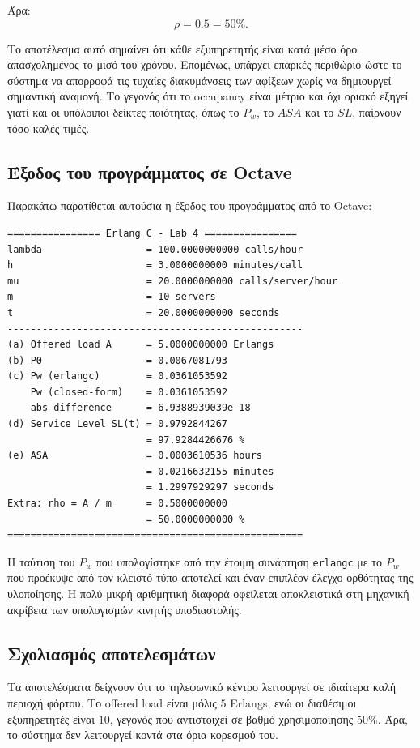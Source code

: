 \documentclass{article}
\begin{document}
Άρα:
\[
\boxed{\rho = 0.5 = 50\%}.
\]

Το αποτέλεσμα αυτό σημαίνει ότι κάθε εξυπηρετητής είναι κατά μέσο όρο απασχολημένος το μισό του χρόνου. Επομένως, υπάρχει επαρκές περιθώριο ώστε το σύστημα να απορροφά τις τυχαίες διακυμάνσεις των αφίξεων χωρίς να δημιουργεί σημαντική αναμονή. Το γεγονός ότι το occupancy είναι μέτριο και όχι οριακό εξηγεί γιατί και οι υπόλοιποι δείκτες ποιότητας, όπως το $P_w$, το $ASA$ και το $SL$, παίρνουν τόσο καλές τιμές.

\subsection{Έξοδος του προγράμματος σε Octave}

Παρακάτω παρατίθεται αυτούσια η έξοδος του προγράμματος από το Octave:

\begin{verbatim}
================ Erlang C - Lab 4 ================
lambda                  = 100.0000000000 calls/hour
h                       = 3.0000000000 minutes/call
mu                      = 20.0000000000 calls/server/hour
m                       = 10 servers
t                       = 20.0000000000 seconds
---------------------------------------------------
(a) Offered load A      = 5.0000000000 Erlangs
(b) P0                  = 0.0067081793
(c) Pw (erlangc)        = 0.0361053592
    Pw (closed-form)    = 0.0361053592
    abs difference      = 6.9388939039e-18
(d) Service Level SL(t) = 0.9792844267
                        = 97.9284426676 %
(e) ASA                 = 0.0003610536 hours
                        = 0.0216632155 minutes
                        = 1.2997929297 seconds
Extra: rho = A / m      = 0.5000000000
                        = 50.0000000000 %
===================================================
\end{verbatim}

Η ταύτιση του $P_w$ που υπολογίστηκε από την έτοιμη συνάρτηση \texttt{erlangc} με το $P_w$ που προέκυψε από τον κλειστό τύπο αποτελεί και έναν επιπλέον έλεγχο ορθότητας της υλοποίησης. Η πολύ μικρή αριθμητική διαφορά οφείλεται αποκλειστικά στη μηχανική ακρίβεια των υπολογισμών κινητής υποδιαστολής.

\subsection{Σχολιασμός αποτελεσμάτων}

Τα αποτελέσματα δείχνουν ότι το τηλεφωνικό κέντρο λειτουργεί σε ιδιαίτερα καλή περιοχή φόρτου. Το offered load είναι μόλις $5$ Erlangs, ενώ οι διαθέσιμοι εξυπηρετητές είναι $10$, γεγονός που αντιστοιχεί σε βαθμό χρησιμοποίησης $50\%$. Άρα, το σύστημα δεν λειτουργεί κοντά στα όρια κορεσμού του.
\end{document}
